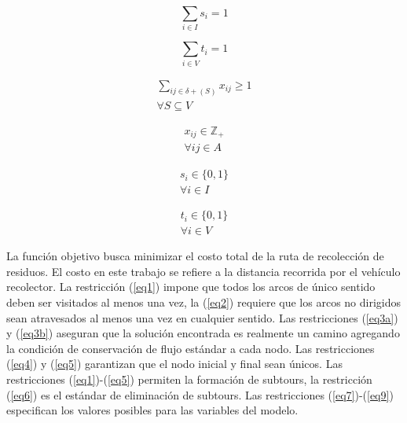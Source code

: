 \begin{equation} \tag{4} \label{eq4}
\sum_{i \in I} s_i = 1 
\end{equation}
\hbox{}

\begin{equation} \tag{5} \label{eq5}
\sum_{i \in V} t_i = 1 
\end{equation}
\hbox{}

\begin{equation} \tag{6} \label{eq6}
\begin{gathered}
    \sum_{i j \in \delta + (S)} x_{i j} \geq 1 \\
    \forall S \subseteq V
\end{gathered}
\end{equation}
\hbox{}

\begin{equation} \tag{7} \label{eq7}
\begin{gathered}
    x_{i j} \in \mathbb{Z}_+ \\
    \forall i j \in A
\end{gathered}
\end{equation}
\hbox{}

\begin{equation} \tag{8} \label{eq8}
\begin{gathered}
    s_i \in \{0,1\} \\
    \forall i \in I
\end{gathered}
\end{equation}
\hbox{}

\begin{equation} \tag{9} \label{eq9}
\begin{gathered}
    t_i \in \{0,1\} \\
    \forall i \in V
\end{gathered}
\end{equation}

La función objetivo busca minimizar el costo total de la ruta de recolección de residuos. El costo en este trabajo se refiere a la distancia recorrida por el vehículo recolector. La restricción (\ref{eq1}) impone que todos los arcos de único sentido deben ser visitados al menos una vez, la (\ref{eq2}) requiere que los arcos no dirigidos sean atravesados al menos una vez en cualquier sentido. Las restricciones (\ref{eq3a}) y (\ref{eq3b}) aseguran que la solución encontrada es realmente un camino agregando la condición de conservación de flujo estándar a cada nodo. Las restricciones (\ref{eq4}) y (\ref{eq5}) garantizan que el nodo inicial y final sean únicos. Las restricciones (\ref{eq1})-(\ref{eq5}) permiten la formación de subtours, la restricción (\ref{eq6}) es el estándar de eliminación de subtours. Las restricciones (\ref{eq7})-(\ref{eq9}) especifican los valores posibles para las variables del modelo.

